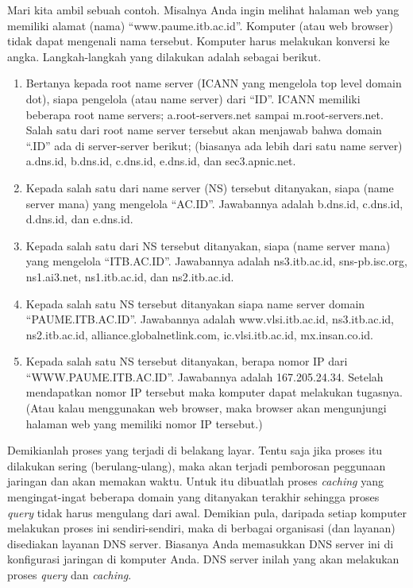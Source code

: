 Mari kita ambil sebuah contoh. Misalnya Anda ingin melihat halaman web yang
memiliki alamat (nama) ``www.paume.itb.ac.id''. Komputer (atau web browser)
tidak dapat mengenali nama tersebut. Komputer harus melakukan konversi ke
angka. Langkah-langkah yang dilakukan adalah sebagai berikut.

\begin{enumerate}
   \item Bertanya kepada root name server (ICANN yang mengelola top level
      domain dot), siapa pengelola (atau name server) dari ``ID''. ICANN
      memiliki beberapa root name servers; a.root-servers.net sampai
      m.root-servers.net.  Salah satu dari root name server
      tersebut akan menjawab bahwa domain ``.ID'' ada di server-server berikut;
      (biasanya ada lebih dari satu name server)
      a.dns.id, b.dns.id, c.dns.id, e.dns.id, dan sec3.apnic.net.
   \item Kepada salah satu dari name server (NS) tersebut ditanyakan, siapa (name
      server mana) yang mengelola ``AC.ID''. Jawabannya adalah b.dns.id,
      c.dns.id, d.dns.id, dan e.dns.id.
   \item Kepada salah satu dari NS tersebut ditanyakan, siapa (name
      server mana) yang mengelola ``ITB.AC.ID''. Jawabannya adalah
      ns3.itb.ac.id, sns-pb.isc.org, ns1.ai3.net, ns1.itb.ac.id, dan
      ns2.itb.ac.id.
   \item Kepada salah satu NS tersebut ditanyakan siapa name server domain
      ``PAUME.ITB.AC.ID''. Jawabannya adalah www.vlsi.itb.ac.id, ns3.itb.ac.id,
      ns2.itb.ac.id, alliance.globalnetlink.com, ic.vlsi.itb.ac.id,
      mx.insan.co.id.
   \item Kepada salah satu NS tersebut ditanyakan, berapa nomor IP dari
      ``WWW.PAUME.ITB.AC.ID''. Jawabannya adalah 167.205.24.34. Setelah
      mendapatkan nomor IP tersebut maka komputer dapat melakukan tugasnya.
      (Atau kalau menggunakan web browser, maka browser akan mengunjungi
      halaman web yang memiliki nomor IP tersebut.)
\end{enumerate}

Demikianlah proses yang terjadi di belakang layar. Tentu saja jika proses itu
dilakukan sering (berulang-ulang), maka akan terjadi pemborosan peggunaan
jaringan dan akan memakan waktu. Untuk itu dibuatlah proses {\em caching} yang
mengingat-ingat beberapa domain yang ditanyakan terakhir sehingga proses {\em
query} tidak harus mengulang dari awal. Demikian pula, daripada setiap komputer
melakukan proses ini sendiri-sendiri, maka di berbagai organisasi (dan layanan)
disediakan layanan DNS server. Biasanya Anda memasukkan DNS server ini di
konfigurasi jaringan di komputer Anda. DNS server inilah yang akan melakukan
proses {\em query} dan {\em caching}. 

